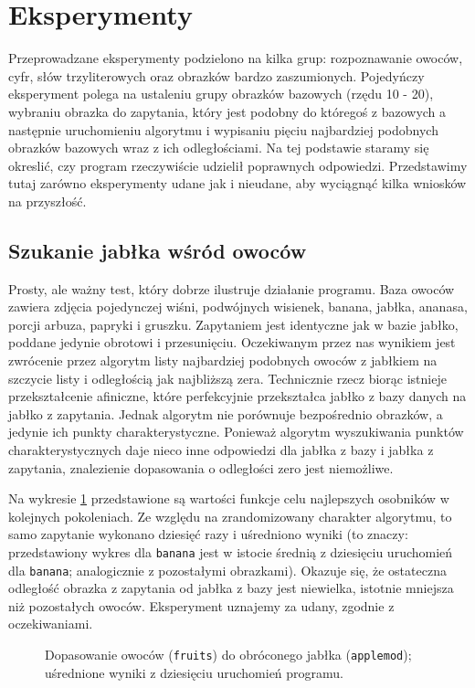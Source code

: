 \documentclass[a4paper,12pt,leqno]{article}
\begin{document}
\section{Eksperymenty}

Przeprowadzane eksperymenty podzielono na kilka grup: rozpoznawanie owoców, cyfr, słów trzyliterowych oraz obrazków bardzo zaszumionych.
Pojedyńczy eksperyment polega na ustaleniu grupy obrazków bazowych (rzędu 10 - 20), wybraniu obrazka do zapytania, który jest podobny do
któregoś z bazowych a następnie uruchomieniu algorytmu i wypisaniu pięciu najbardziej podobnych obrazków bazowych wraz z ich odległościami.
Na tej podstawie staramy się okreslić, czy program rzeczywiście udzielił poprawnych odpowiedzi. Przedstawimy tutaj zarówno eksperymenty udane
jak i nieudane, aby wyciągnąć kilka wniosków na przyszłość.

\subsection{Szukanie jabłka wśród owoców}
Prosty, ale ważny test, który dobrze ilustruje działanie programu. Baza owoców zawiera zdjęcia pojedynczej wiśni, podwójnych wisienek, banana, 
jabłka, ananasa, porcji arbuza, papryki i gruszku. Zapytaniem jest identyczne jak w bazie jabłko, poddane jedynie obrotowi i przesunięciu.
Oczekiwanym przez nas wynikiem jest zwrócenie przez algorytm listy najbardziej podobnych owoców z jabłkiem na szczycie listy i odległością jak
najbliższą zera. Technicznie rzecz biorąc istnieje przekształcenie afiniczne, które perfekcyjnie przekształca jabłko z bazy danych na jabłko z
zapytania. Jednak algorytm nie porównuje bezpośrednio obrazków, a jedynie ich punkty charakterystyczne. Ponieważ algorytm wyszukiwania punktów
charakterystycznych daje nieco inne odpowiedzi dla jabłka z bazy i jabłka z zapytania, znalezienie dopasowania o odległości zero jest niemożliwe.

Na wykresie \ref{applemod} przedstawione są wartości funkcje celu najlepszych osobników w kolejnych pokoleniach. Ze względu na zrandomizowany
charakter algorytmu, to samo zapytanie wykonano dziesięć razy i uśredniono wyniki (to znaczy: przedstawiony wykres dla \texttt{banana} jest w
istocie średnią z dziesięciu uruchomień dla \texttt{banana}; analogicznie z pozostałymi obrazkami). Okazuje się, że ostateczna odległość
obrazka z zapytania od jabłka z bazy jest niewielka, istotnie mniejsza niż pozostałych owoców. Eksperyment uznajemy za udany, zgodnie z oczekiwaniami.

\begin{figure}\centering
\footnotesize\vspace{-2em}
\normalsize\caption{Dopasowanie owoców (\texttt{fruits}) do obróconego jabłka (\texttt{applemod}); uśrednione wyniki z dziesięciu uruchomień programu.}\label{applemod}
\end{figure} 
\end{document}
